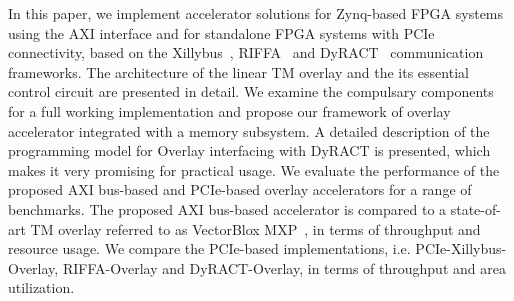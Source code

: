 In this paper, we implement accelerator solutions for Zynq-based FPGA systems using the AXI interface and for standalone FPGA systems with PCIe connectivity, based on the Xillybus~\cite{xillybus2018}, RIFFA~\cite{jacobsen2015riffa} and DyRACT~\cite{vipin2014dyract} communication frameworks. 
The architecture of the linear TM overlay and the its essential control circuit are presented in detail. 
We examine the compulsary components for a full working implementation and propose our framework of overlay accelerator integrated with a memory subsystem. 
A detailed description of the programming model for Overlay interfacing with DyRACT is presented, which makes it very promising for practical usage.
We evaluate the performance of the proposed AXI bus-based and PCIe-based overlay accelerators for a range of benchmarks. 
The proposed AXI bus-based accelerator is compared to a state-of-art TM overlay referred to as VectorBlox MXP~\cite{severance2013embedded}, in terms of throughput and resource usage. 
We compare the PCIe-based implementations, i.e. PCIe-Xillybus-Overlay, RIFFA-Overlay and DyRACT-Overlay, in terms of throughput and area utilization. 


\begin{comment}
The main contributions can be summarized as follows:

\begin{itemize}
	\item	
	Examine memory interfaces for hardware accelerators implemented on FPGAs, and provide a comprehensive analysis of two of the state-of-the-art integration frameworks, i.e. Xillybus and RIFFA. 
	
	\item
	Propose complete hardware accelerator systems by integrating the linear TM overlays with Xillybus and RIFFA interfaces, respectively, and evaluate the throughput and resource usage of these hardware accelerators for a range of benchmarks.
	
	\item
	Make comparisons with a state-of-the-art TM overlay, namely VectorBlox MXP, which shows that the proposed overlay achieves approximately 50\% of the throughput, but uses just half of the bandwidth and less than 20\% hardware resource compared to MXP.
	
\end{itemize}
\end{comment}
